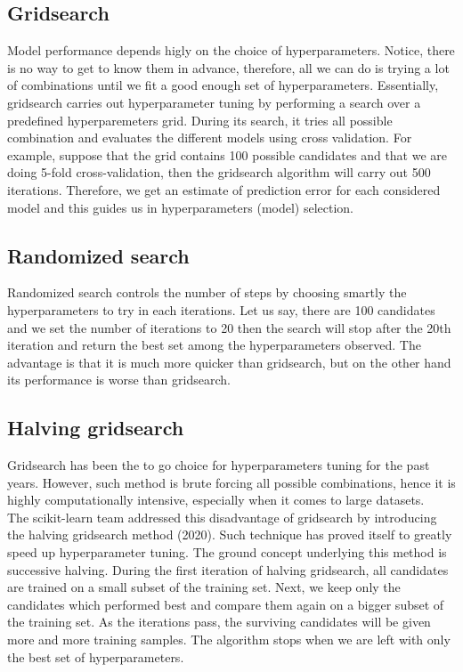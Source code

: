 \subsection{Gridsearch}
Model performance depends higly on the choice of hyperparameters. Notice, there is no way to get to know them in advance, therefore, all we can do is trying a lot of combinations until we fit a good enough set of hyperparameters. Essentially, gridsearch carries out hyperparameter tuning by performing a search over a predefined hyperparemeters grid. During its search, it tries all possible combination and evaluates the different models %
using cross validation. For example, suppose that the grid contains 100 possible candidates and that we are doing 5-fold cross-validation, then the gridsearch algorithm will carry out 500 iterations.
Therefore, we get an estimate of prediction error for each considered model and this guides us in hyperparameters (model) selection.

\subsection{Randomized search}
Randomized search controls the number of steps by choosing smartly the hyperparameters to try in each iterations.
Let us say, there are 100 candidates and we set the number of iterations to 20 then the search will stop after the 20th iteration and return the best set among the hyperparameters observed.
The advantage is that it is much more quicker than gridsearch, but on the other hand its performance is worse than gridsearch.

\subsection{Halving gridsearch}
Gridsearch has been the to go choice for hyperparameters tuning for the past years. However, such method is brute forcing all possible combinations, hence it is highly computationally intensive, especially when it comes to large datasets.
\\
The scikit-learn team addressed this disadvantage of gridsearch by introducing the halving gridsearch method  (2020). Such technique has proved itself to greatly speed up hyperparameter tuning.
The ground concept underlying this method is successive halving. During the first iteration of halving gridsearch, all candidates are trained on a small subset of the training set. Next, we keep only the candidates which performed best and compare  them again on a bigger subset of the training set. As the iterations pass, the surviving candidates will be given more and more training samples. The algorithm stops when we are left with only the best set of hyperparameters.

